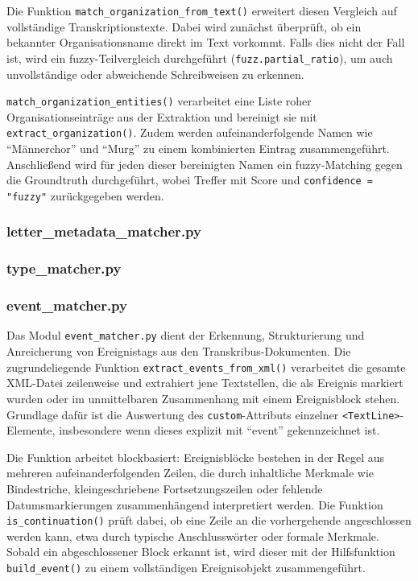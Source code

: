 \documentclass[12pt, a4paper, ngerman, bidi=default]{article}
\newcommand{\code}[1]{\colorbox{VeryLightGray}{\texttt{#1}}} %
\begin{document}
Die Funktion \code{match\_organization\_from\_text()} erweitert diesen Vergleich auf vollständige Transkriptionstexte. Dabei wird zunächst überprüft, ob ein bekannter Organisationsname direkt im Text vorkommt. Falls dies nicht der Fall ist, wird ein fuzzy-Teilvergleich durchgeführt (\code{fuzz.partial\_ratio}), um auch unvollständige oder abweichende Schreibweisen zu erkennen.

\code{match\_organization\_entities()} verarbeitet eine Liste roher Organisationseinträge aus der Extraktion und bereinigt sie mit \code{extract\_organization()}. Zudem werden aufeinanderfolgende Namen wie \enquote{Männerchor} und \enquote{Murg} zu einem kombinierten Eintrag zusammengeführt. Anschließend wird für jeden dieser bereinigten Namen ein fuzzy-Matching gegen die Groundtruth durchgeführt, wobei Treffer mit Score und \code{confidence = "fuzzy"} zurückgegeben werden.

\subsubsection{letter\_metadata\_matcher.py}\label{subsection:letter_metadata_matcher}

\subsubsection{type\_matcher.py}\label{subsection:type_matcher}


\subsubsection*{event\_matcher.py}\label{subsection:event_matcher}

Das Modul \texttt{event\_matcher.py} dient der Erkennung, Strukturierung und Anreicherung von 
Ereignistags aus den Transkribus-Dokumenten. Die zugrundeliegende Funktion \texttt{extract\_events\_from\_xml()} 
verarbeitet die gesamte XML-Datei zeilenweise und extrahiert jene Textstellen, die als Ereignis markiert 
wurden oder im unmittelbaren Zusammenhang mit einem Ereignisblock stehen. Grundlage dafür ist die Auswertung 
des \texttt{custom}-Attributs einzelner \texttt{<TextLine>}-Elemente, insbesondere wenn dieses explizit mit 
\enquote{event} gekennzeichnet ist.

Die Funktion arbeitet blockbasiert: Ereignisblöcke bestehen in der Regel aus mehreren aufeinanderfolgenden 
Zeilen, die durch inhaltliche Merkmale wie Bindestriche, kleingeschriebene Fortsetzungszeilen oder fehlende 
Datumsmarkierungen zusammenhängend interpretiert werden. Die Funktion \texttt{is\_continuation()} prüft dabei, 
ob eine Zeile an die vorhergehende angeschlossen werden kann, etwa durch typische Anschlusswörter oder formale Merkmale. 
Sobald ein abgeschlossener Block erkannt ist, wird dieser mit der Hilfsfunktion \texttt{build\_event()} zu einem 
vollständigen Ereignisobjekt zusammengeführt.
\end{document}
